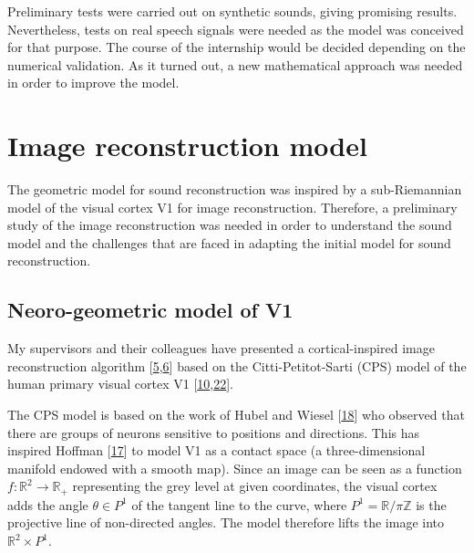 \documentclass[
  american,
]{article}
\begin{document}
Preliminary tests were carried out on synthetic sounds, giving promising results.
Nevertheless, tests on real speech signals were needed as the model
was conceived for that purpose.
The course of the internship would be decided depending on the numerical validation.
As it turned out, a new mathematical approach was needed in order
to improve the model.

\pagebreak

\hypertarget{image-reconstruction-model}{%
\section{Image reconstruction model}\label{image-reconstruction-model}}

The geometric model for sound reconstruction was inspired by
a sub-Riemannian model of the visual cortex V1 for image reconstruction.
Therefore, a preliminary study of the image reconstruction was needed
in order to understand the sound model and the challenges that are
faced in adapting the initial model for sound reconstruction.

\hypertarget{neoro-geometric-model-of-v1}{%
\subsection{Neoro-geometric model of V1}\label{neoro-geometric-model-of-v1}}

My supervisors and their colleagues have presented a cortical-inspired
image reconstruction algorithm {[}\protect\hyperlink{ref-bertalmio2018}{5},\protect\hyperlink{ref-boscain2017}{6}{]} based
on the Citti-Petitot-Sarti (CPS) model of the human primary visual cortex V1 {[}\protect\hyperlink{ref-citti2006}{10},\protect\hyperlink{ref-petitot1999}{22}{]}.

The CPS model is based on the work of Hubel and Wiesel {[}\protect\hyperlink{ref-hubel1959}{18}{]} who observed that there are
groups of neurons sensitive to positions and directions.
This has inspired Hoffman {[}\protect\hyperlink{ref-hoffman1989}{17}{]} to model V1 as a contact space
(a three-dimensional manifold endowed with a smooth map).
Since an image can be seen as a function \(f:\mathbb{R}^2\rightarrow\mathbb{R}_+\) representing
the grey level at given coordinates, the visual cortex adds
the angle \(\theta\in P^1\) of the tangent line to the curve,
where \(P^1=\mathbb{R}/\pi\mathbb{Z}\) is the projective line of non-directed angles.
The model therefore lifts the image into \(\mathbb{R}^2\times P^1\).
\end{document}
